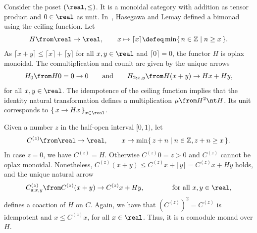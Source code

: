 \begin{example}\label{ex:comodule-monads-example}
  Consider the poset \((\real, \leq)\).
  It is a monoidal category with addition as tensor product and \(0 \in \real\) as unit.
  In~\cite{hasegawa-lemay2018:LinearHopf}, Hasegawa and Lemay defined a bimonad using the ceiling function.
  Let
  \[
    H \from \real\to \real, \qquad x \mapsto \lceil x \rceil \defeq \min \{\, n\in \mathbb{Z} \mid n \geq x \,\}.
  \]
  As \(\lceil x + y \rceil \leq \lceil x \rceil + \lceil y \rceil\) for all \(x,y \in \real\) and \(\lceil 0 \rceil = 0\), the functor \(H\) is oplax monoidal.
  The comultiplication and counit are given by the unique arrows
  \[
    H_0\from H0 = 0 \to 0 \qquad\text{and}\qquad H_{2; x,y} \from H(x+y) \to Hx+ Hy,
  \]
  for all \(x,y \in \real\).
  The idempotence of the ceiling function implies that the identity natural transformation defines a multiplication \(\mu \from H^2 \nt H\).
  Its unit corresponds to \({\{\, x \to Hx \,\}}_{x \in \real}\).

  Given a number \(z\) in the half-open interval \([0, 1)\), let
  \[
    C^{(z)} \from \real \to \real, \qquad x \mapsto \min\{\, z+ n \mid n \in \mathbb{Z}, z+n \geq x \,\}.
  \]
  In case \(z=0\), we have \(C^{(z)} = H\).
  Otherwise \(C^{(z)}0 = z > 0\) and \(C^{(z)}\) cannot be oplax monoidal.
  Nonetheless, \(C^{(z)}(x+y) \leq C^{(z)} x + \lceil y \rceil = C^{(z)} x + Hy\) holds,
  and the unique natural arrow
  \[
    C^{(z)}_{\mathsf{a};x,y}\from C^{(z)}(x+y) \to C^{(z)} x + Hy, \qquad\qquad \text{for all } x,y\in \real,
  \]
  defines a coaction of \(H\) on \(C\).
  Again, we have that \({(C^{(z)})}^2 = C^{(z)}\) is idempotent
  and \(x \leq C^{(z)}x\), for all \(x \in \real\).
  Thus, it is a comodule monad over \(H\).
\end{example}

